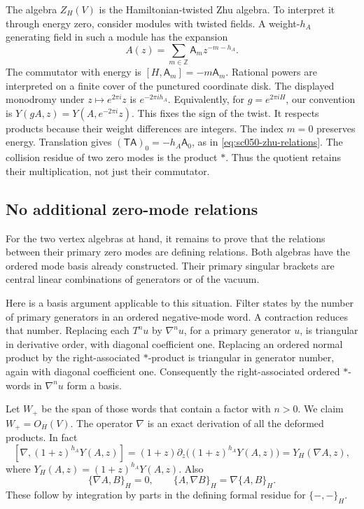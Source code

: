 The algebra \(Z_H(V)\) is the Hamiltonian-twisted Zhu algebra.
To interpret it through energy zero, consider modules with
twisted fields. A weight-\(h_A\) generating field in such a
module has the expansion
\[
 A(z)=\sum_{m\in\mathbb Z}\mathsf A_m z^{-m-h_A}.
\]
The commutator with energy is
\([H,\mathsf A_m]=-m\mathsf A_m\).
Rational powers are interpreted on a finite cover of the punctured
coordinate disk. The displayed monodromy under \(z\mapsto e^{2\pi i}z\) is
\(e^{-2\pi ih_A}\). Equivalently, for \(g=e^{2\pi iH}\), our
convention is \(Y(gA,z)=Y(A,e^{-2\pi i}z)\). This fixes the
sign of the twist. It respects products because their weight
differences are integers.
The index \(m=0\) preserves energy. Translation gives
\(\mathsf{(TA)}_0=-h_A\mathsf A_0\), as in
\eqref{eq:sc050-zhu-relations}.
The collision residue of two zero modes is the product \(*\).
Thus the quotient retains their multiplication, not just their
commutator.

\subsection{No additional zero-mode relations}

For the two vertex algebras at hand, it remains to prove that the
relations between their primary zero modes are defining relations.
Both algebras have the ordered mode basis already constructed.
Their primary singular brackets are central linear combinations
of generators or of the vacuum.

Here is a basis argument applicable to this situation. Filter states
by the number of primary generators in an ordered negative-mode
word. A contraction reduces that number. Replacing each \(T^nu\)
by \(\nabla^nu\), for a primary generator \(u\), is triangular in
derivative order, with diagonal coefficient one. Replacing an
ordered normal product by the right-associated \(*\)-product is
triangular in generator number, again with diagonal coefficient
one. Consequently the right-associated ordered \(*\)-words in
\(\nabla^nu\) form a basis.

Let \(W_+\) be the span of those words that contain a factor with
\(n>0\). We claim \(W_+=O_H(V)\). The operator \(\nabla\) is an
exact derivation of all the deformed products. In fact
\[
 [\nabla,(1+z)^{h_A}Y(A,z)]
   =(1+z)\partial_z\bigl((1+z)^{h_A}Y(A,z)\bigr)
   =Y_H(\nabla A,z),
\]
where \(Y_H(A,z)=(1+z)^{h_A}Y(A,z)\).
Also
\[
 \{\nabla A,B\}_H=0,\qquad
 \{A,\nabla B\}_H=\nabla\{A,B\}_H.
\]
These follow by integration by parts in the defining formal
residue for \(\{-,-\}_H\).

